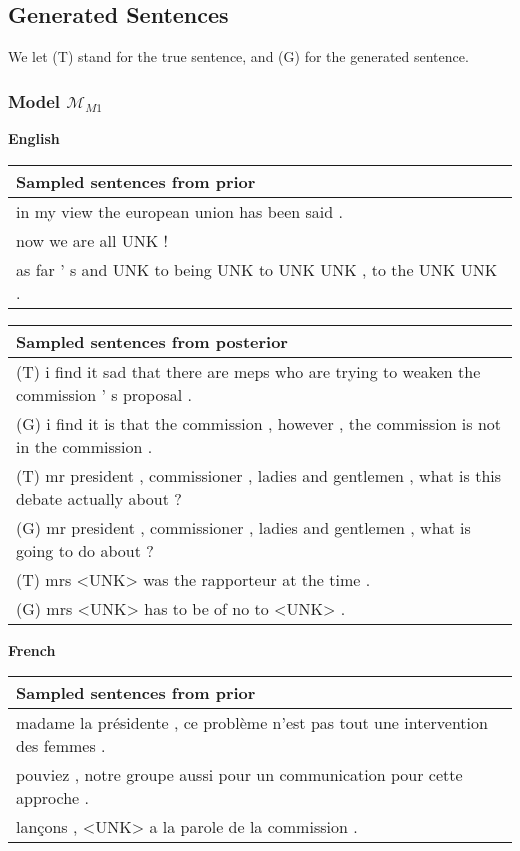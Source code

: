 \subsection{Generated Sentences}

We let (T) stand for the true sentence, and (G) for the generated sentence.

\subsubsection{Model $\mathcal{M}_{M1}$}

\textbf{English}

\begin{center}
  \begin{tabular}{|L{14cm}|} 
    \hline
    Sampled sentences from prior\\ [0.5ex] 
    \hline\hline
    in my view the european union has been said .\\
    \hline
    now we are all UNK ! \\
    \hline
    as far ' s and UNK to being UNK to UNK UNK , to the UNK UNK .\\
    \hline
  \end{tabular}
\end{center}

\begin{center}
  \begin{tabular}{|L{14cm}|} 
    \hline
    Sampled sentences from posterior\\ [0.5ex] 
    \hline\hline
    (T) i find it sad that there are meps who are trying to weaken the commission ' s proposal .\\
    (G) i find it is that the commission , however , the commission is not in the commission .\\
    \hline
    (T) mr president , commissioner , ladies and gentlemen , what is this debate actually about ?\\
    (G) mr president , commissioner , ladies and gentlemen , what is going to do about ?\\
    \hline
    (T) mrs <UNK> was the rapporteur at the time .\\
    (G) mrs <UNK> has to be of no to <UNK> .\\
    \hline
  \end{tabular}
\end{center}

\textbf{French}

\begin{center}
  \begin{tabular}{|L{14cm}|} 
    \hline
    Sampled sentences from prior\\ [0.5ex] 
    \hline\hline
    madame la présidente , ce problème n'est pas tout une intervention des femmes .\\
    \hline
    pouviez , notre groupe aussi pour un communication pour cette approche .\\
    \hline
    lançons , <UNK> a la parole de la commission .\\
    \hline
  \end{tabular}
\end{center}

